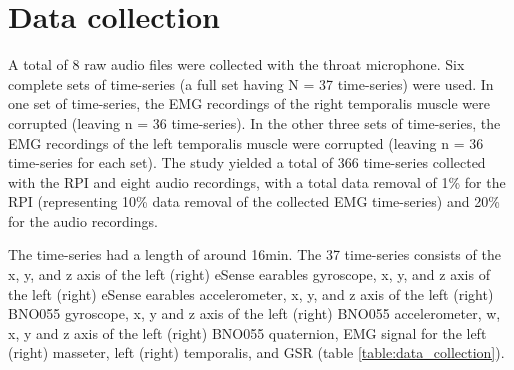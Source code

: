 \section{Data collection}

A total of 8 raw audio files were collected with the throat microphone. Six complete sets of time-series (a full set having N = 37 time-series) were used. In one set of time-series, the EMG recordings of the right temporalis muscle were corrupted (leaving n = 36 time-series). In the other three sets of time-series, the EMG recordings of the left temporalis muscle were corrupted (leaving n = 36 time-series for each set). The  study  yielded a total of 366 time-series collected with the RPI and eight audio recordings, with a total data removal of 1\% for the RPI (representing 10\% data removal of the collected EMG time-series) and 20\% for the audio recordings.

The time-series had a length of around 16min. The 37 time-series consists of the x, y, and z axis of the left (right) eSense earables gyroscope, x, y, and z axis of the left (right) eSense earables accelerometer, x, y, and z axis of the left (right) BNO055 gyroscope, x, y and z axis of the left (right) BNO055 accelerometer, w, x, y and z axis of the left (right) BNO055 quaternion, EMG signal for the left (right) masseter, left (right) temporalis, and GSR (table \ref{table:data_collection}).

